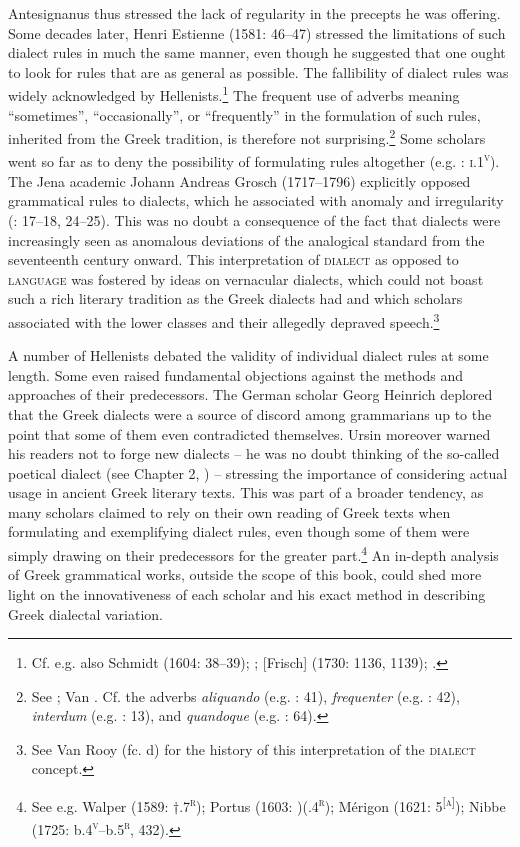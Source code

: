 Antesignanus thus stressed the lack of regularity in the precepts he was offering. Some decades later, Henri Estienne (1581: 46–47) stressed the limitations of such dialect rules in much the same manner, even though he suggested that one ought to look for rules that are as general as possible. The fallibility of dialect rules was widely acknowledged by Hellenists.\footnote{{Cf. e.g. also Schmidt (1604: 38–39); \citet[2]{Heupel1712}; [Frisch] (1730: 1136, 1139); \citet[299]{Jehne1782}.}} The frequent use of adverbs meaning “sometimes”, “occasionally”, or “frequently” in the formulation of such rules, inherited from the Greek tradition, is therefore not surprising.\footnote{{See \citet[53]{Förstel1999}; Van \citet[516]{Rooy2014}. Cf. the adverbs} {\textit{aliquando}} {(e.g. \citealt{Walper1589}: 41),} {\textit{frequenter}} {(e.g. \citealt{Walper1589}: 42),} {\textit{interdum}} {(e.g. \citealt{Antesignanus1554}: 13),}{ }{and} {\textit{quandoque}} {(e.g. \citealt{Walper1589}: 64).}} Some scholars went so far as to deny the possibility of formulating rules altogether (e.g. \citealt{Camden1595}: \textsc{i}.1\textsc{\textsuperscript{v}}). The Jena academic Johann Andreas Grosch (1717–1796) explicitly opposed grammatical rules to dialects, which he associated with anomaly and irregularity (\citealt{Grosch1753}: 17–18, 24–25). This was no doubt a consequence of the fact that dialects were increasingly seen as anomalous deviations of the analogical standard from the seventeenth century onward. This interpretation of \textsc{dialect} as opposed to \textsc{language} was fostered by ideas on vernacular dialects, which could not boast such a rich literary tradition as the Greek dialects had and which scholars associated with the lower classes and their allegedly depraved speech.\footnote{{See Van Rooy (fc. d) for the history of this interpretation of the} {\textsc{dialect}} {concept.}}

A number of Hellenists debated the validity of individual dialect rules at some length. Some even raised fundamental objections against the methods and approaches of their predecessors. The German scholar Georg Heinrich \citet[512]{Ursin1691} deplored that the Greek dialects were a source of discord among grammarians up to the point that some of them even contradicted themselves. Ursin moreover warned his readers not to forge new dialects – he was no doubt thinking of the so-called poetical dialect (see Chapter 2, ) – stressing the importance of considering actual usage in ancient Greek literary texts. This was part of a broader tendency, as many scholars claimed to rely on their own reading of Greek texts when formulating and exemplifying dialect rules, even though some of them were simply drawing on their predecessors for the greater part.\footnote{{See e.g. Walper (1589: †.7}{\textsc{\textsuperscript{r}}}{); Portus (1603: )(.4}{\textsc{\textsuperscript{r}}}{); Mérigon (1621: 5}{\textsc{\textsuperscript{[a]}}}{); Nibbe (1725: b.4}{\textsc{\textsuperscript{v}}}{–b.5}{\textsc{\textsuperscript{r}}}{, 432).}} An in-depth analysis of Greek grammatical works, outside the scope of this book, could shed more light on the innovativeness of each scholar and his exact method in describing Greek dialectal variation.

